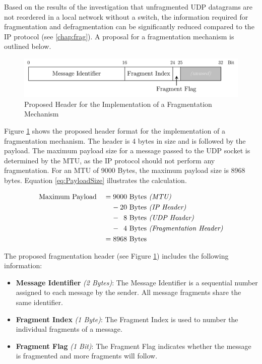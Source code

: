 Based on the results of the investigation that unfragmented UDP datagrams are not reordered in a local network without a switch, the information required for fragmentation and defragmentation can be significantly reduced compared to the IP protocol (see \ref{chap:frag}). A proposal for a fragmentation mechanism is outlined below.

\begin{figure}[h!]
    \centering
    \includegraphics[width=1\linewidth]{figures/outlook/frag_header.pdf}
    \caption{Proposed Header for the Implementation of a Fragmentation Mechanism}
    \label{fig:FragProposal}
\end{figure}

Figure \ref{fig:FragProposal} shows the proposed header format for the implementation of a fragmentation mechanism. The header is 4 bytes in size and is followed by the payload. The maximum payload size for a message passed to the UDP socket is determined by the MTU, as the IP protocol should not perform any fragmentation. For an MTU of 9000 Bytes, the maximum payload size is 8968 bytes. Equation \ref{eq:PayloadSize} illustrates the calculation.

\begin{alignat}{2}
&\text{Maximum Payload} &&= 9000\ \text{Bytes \textit{(MTU)}} \label{eq:PayloadSize}\\
&&&\phantom{=}\ - 20\ \text{Bytes \textit{(IP Header)}} \notag \\
&&&\phantom{=}\ - \phantom{0}8\ \text{Bytes \textit{(UDP Header)}} \notag \\
&&&\phantom{=}\ - \phantom{0}4\ \text{Bytes \textit{(Fragmentation Header)}} \notag \\
&&&= 8968\ \text{Bytes} \notag
\end{alignat}

The proposed fragmentation header (see Figure \ref{fig:FragProposal}) includes the following information:

\begin{itemize}
  \item \textbf{Message Identifier} \textit{(2 Bytes)}: The Message Identifier is a sequential number assigned to each message by the sender. All message fragments share the same identifier.
  \item \textbf{Fragment Index} \textit{(1 Byte)}: The Fragment Index is used to number the individual fragments of a message.
  \item \textbf{Fragment Flag} \textit{(1 Bit)}: The Fragment Flag indicates whether the message is fragmented and more fragments will follow.
\end{itemize}

